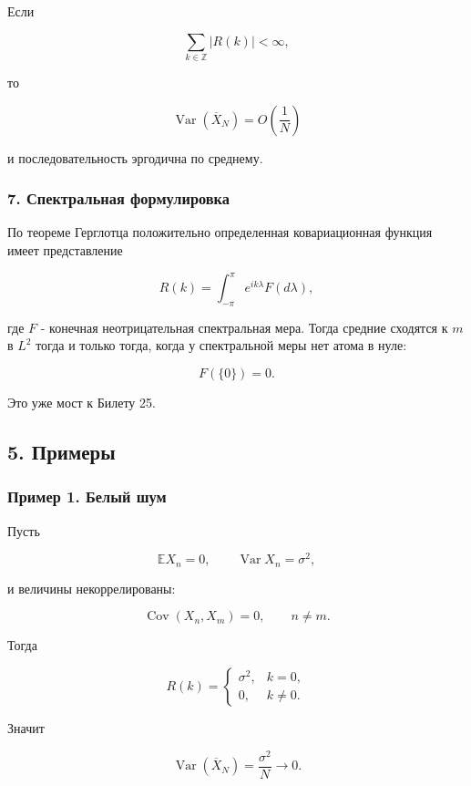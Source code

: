 \documentclass[
  11pt,
  a4paper,
]{article}
\begin{document}
Если

\[
\sum_{k\in\mathbb Z}|R(k)|<\infty,
\]

то

\[
\operatorname{Var}(\overline X_N)=O\left(\frac1N\right)
\]

и последовательность эргодична по среднему.

\subsubsection{7. Спектральная
формулировка}\label{ux441ux43fux435ux43aux442ux440ux430ux43bux44cux43dux430ux44f-ux444ux43eux440ux43cux443ux43bux438ux440ux43eux432ux43aux430}

По теореме Герглотца положительно определенная ковариационная функция
имеет представление

\[
R(k)=\int_{-\pi}^{\pi}e^{ik\lambda}F(d\lambda),
\]

где \(F\) - конечная неотрицательная спектральная мера. Тогда средние
сходятся к \(m\) в \(L^2\) тогда и только тогда, когда у спектральной
меры нет атома в нуле:

\[
F(\{0\})=0.
\]

Это уже мост к Билету 25.

\subsection{5. Примеры}\label{ux43fux440ux438ux43cux435ux440ux44b}

\subsubsection{Пример 1. Белый
шум}\label{ux43fux440ux438ux43cux435ux440-1.-ux431ux435ux43bux44bux439-ux448ux443ux43c}

Пусть

\[
\mathbb E X_n=0,
\qquad
\operatorname{Var}X_n=\sigma^2,
\]

и величины некоррелированы:

\[
\operatorname{Cov}(X_n,X_m)=0,
\qquad
n\ne m.
\]

Тогда

\[
R(k)=
\begin{cases}
\sigma^2, & k=0,\\
0, & k\ne0.
\end{cases}
\]

Значит

\[
\operatorname{Var}(\overline X_N)=\frac{\sigma^2}{N}\to0.
\]
\end{document}
